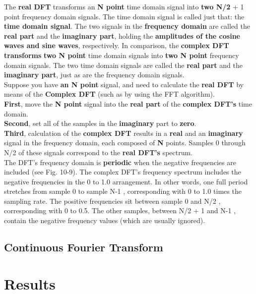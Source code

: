 \documentclass[a4paper,12pt]{article}
\begin{document}
The \textbf{real DFT} transforms an \textbf{N point} time domain signal into
\textbf{two N/2} + 1 point frequency domain signals. The time domain
signal is called just that: the \textbf{time domain signal}. The two signals in the
\textbf{frequency domain} are called the \textbf{real part} and the \textbf{imaginary part},
holding the \textbf{amplitudes of the cosine waves and sine waves}, respectively.
In comparison, the \textbf{complex DFT transforms} \textbf{two N point} time domain signals
into \textbf{two N point} frequency domain signals. The two time domain signals are
called the \textbf{real part} and the \textbf{imaginary part}, just as are the frequency domain
signals.
\\Suppose you have \textbf{an N point} signal, and need to calculate the \textbf{real DFT} by
means of the \textbf{Complex DFT} (such as by using the FFT algorithm).\\
\textbf{First}, move the \textbf{N point} signal into the \textbf{real part} of the \textbf{complex DFT's} time domain.\\
\textbf{Second}, set all of the samples in the \textbf{imaginary} part to \textbf{zero}.\\
\textbf{Third}, calculation of the \textbf{complex DFT} results in a \textbf{real} and an \textbf{imaginary} signal in the frequency domain, each composed of \textbf{N} points.
Samples 0 through N/2 of these signals correspond to the \textbf{real DFT's} spectrum.\\
The DFT's frequency domain is \textbf{periodic} when the negative frequencies are included (see Fig. 10-9).
The complex DFT's frequency spectrum includes the negative frequencies in the 0
to 1.0 arrangement. In other words, one full period stretches from sample 0 to
sample N-1 , corresponding with 0 to 1.0 times the sampling rate. The positive
frequencies sit between sample 0 and N/2 , corresponding with 0 to 0.5. The
other samples, between N/2 + 1 and N-1 , contain the negative frequency
values (which are usually ignored). \cite{smith1997dspbook}

\subsection{Continuous Fourier Transform}


\section{Results}
\end{document}
